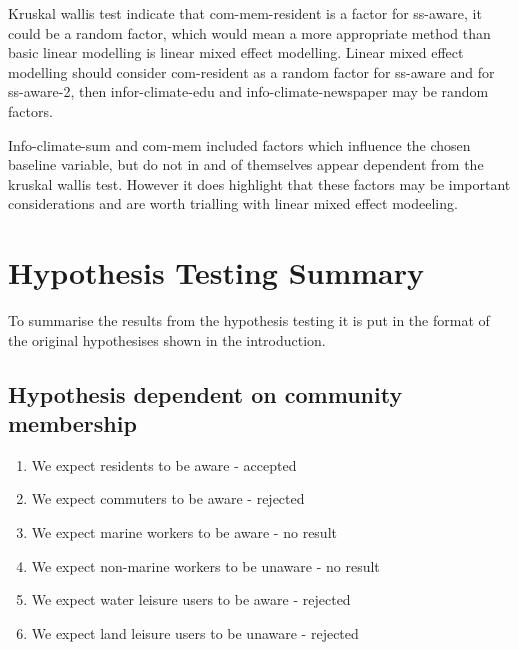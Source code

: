 Kruskal wallis test indicate that com-mem-resident is a factor for ss-aware, it could be a random factor, which would mean a more appropriate method than basic linear modelling is linear mixed effect modelling. Linear mixed effect modelling should consider com-resident as a random factor for ss-aware and for ss-aware-2, then infor-climate-edu and info-climate-newspaper may be random factors.

Info-climate-sum and com-mem included factors which influence the chosen baseline variable, but do not in and of themselves appear dependent from the kruskal wallis test. However it does highlight that these factors may be important considerations and are worth trialling with linear mixed effect modeeling.



\section{Hypothesis Testing Summary}
To summarise the results from the hypothesis testing it is put in the format of the original hypothesises shown in the introduction. 

\subsection{Hypothesis dependent on community membership}
\begin{enumerate}
    \item We expect residents to be aware - accepted
    \item We expect commuters to be aware - rejected
    \item We expect marine workers to be aware - no result
    \item We expect non-marine workers to be unaware - no result
    \item We expect water leisure users to be aware - rejected
    \item We expect land leisure users to be unaware - rejected
    \end{enumerate}
